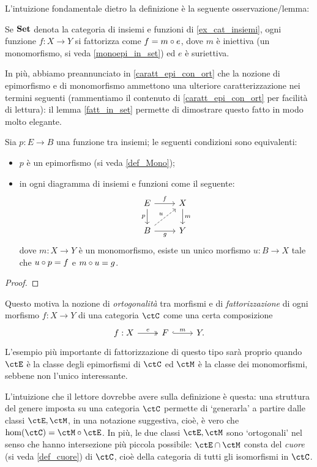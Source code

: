 \medskip
L'intuizione fondamentale dietro la definizione è la seguente osservazione/lemma:
\begin{lemma}\label{fatt_in_set}
	Se \(\mathbf{Set}\) denota la categoria di insiemi e funzioni di \ref{ex_cat_insiemi}, ogni funzione \(f : X \to Y\) si fattorizza come \(f = m \circ e\), dove \(m\) è iniettiva (un monomorfismo, si veda \ref{monoepi_in_set}) ed \(e\) è suriettiva.%
\end{lemma}
In più, abbiamo preannunciato in \ref{caratt_epi_con_ort} che la nozione di epimorfismo e di monomorfismo ammettono una ulteriore caratterizzazione nei termini seguenti (rammentiamo il contenuto di \ref{caratt_epi_con_ort} per facilità di lettura): il lemma \ref{fatt_in_set} permette di dimostrare questo fatto in modo molto elegante.
\begin{proposition*}
	Sia \(p : E \to B\) una funzione tra insiemi; le seguenti condizioni sono equivalenti:
	\begin{itemize}
		\item \(p\) è un epimorfismo (si veda \ref{def_Mono});
		\item in ogni diagramma di insiemi e funzioni come il seguente:
		      \[\begin{tikzcd}
				      E \ar[r, "f"]\ar[d, "p"']& X \ar[d, "m"]\\
				      B \ar[r, "g"'] \ar[ur, dashed, "u"]& Y
			      \end{tikzcd}\]
		      dove \(m : X\to Y\) è un monomorfismo, esiste un unico morfismo \(u : B\to X\) tale che \(u\circ p = f\) e \(m\circ u = g\).
	\end{itemize}
\end{proposition*}
\begin{proof}
	\Todo{}
\end{proof}
Questo motiva la nozione di \emph{ortogonalità} tra morfismi e di \emph{fattorizzazione} di ogni morfismo \(f : X\to Y\) di una categoria \(\ctC\) come una certa composizione
\[
	\begin{tikzcd}
		f : X \ar[r, "e", two heads]& F \ar[r, "m", hook] & Y.
	\end{tikzcd}
\]
L'esempio più importante di fattorizzazione di questo tipo sarà proprio quando \(\ctE\) è la classe degli epimorfismi di \(\ctC\) ed \(\ctM\) è la classe dei monomorfismi, sebbene non l'unico interessante.

L'intuizione che il lettore dovrebbe avere sulla definizione è questa: una struttura del genere imposta su una categoria \(\ctC\) permette di `generarla' a partire dalle classi \(\ctE,\ctM\), in una notazione suggestiva, cioè, è vero che \(\hom(\ctC) = \ctM\cmp \ctE\). In più, le due classi \(\ctE,\ctM\) sono `ortogonali' nel senso che hanno intersezione più piccola possibile: \(\ctE\cap \ctM\) consta del \emph{cuore} (si veda \ref{def_cuore}) di \(\ctC\), cioè della categoria di tutti gli isomorfismi in \(\ctC\).

